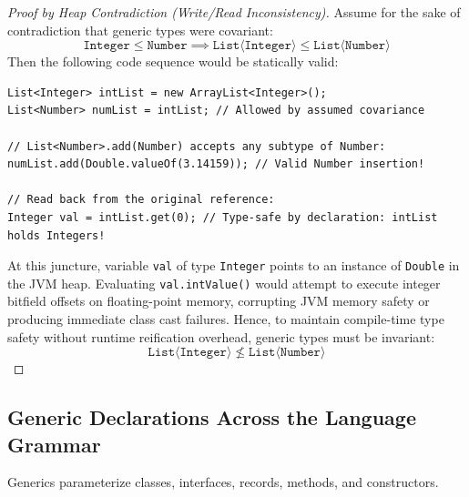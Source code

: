 \documentclass[10pt,journal,compsoc,onecolumn]{IEEEtran}
\begin{document}
\begin{proof}[Proof by Heap Contradiction (Write/Read Inconsistency)]
Assume for the sake of contradiction that generic types were covariant:
\begin{equation}
\texttt{Integer} \le \texttt{Number} \implies \texttt{List}\langle\texttt{Integer}\rangle \le \texttt{List}\langle\texttt{Number}\rangle
\end{equation}
Then the following code sequence would be statically valid:
\begin{lstlisting}
List<Integer> intList = new ArrayList<Integer>();
List<Number> numList = intList; // Allowed by assumed covariance

// List<Number>.add(Number) accepts any subtype of Number:
numList.add(Double.valueOf(3.14159)); // Valid Number insertion!

// Read back from the original reference:
Integer val = intList.get(0); // Type-safe by declaration: intList holds Integers!
\end{lstlisting}
At this juncture, variable \texttt{val} of type \texttt{Integer} points to an instance of \texttt{Double} in the JVM heap. Evaluating \texttt{val.intValue()} would attempt to execute integer bitfield offsets on floating-point memory, corrupting JVM memory safety or producing immediate class cast failures.
Hence, to maintain compile-time type safety without runtime reification overhead, generic types must be invariant:
\begin{equation}
\texttt{List}\langle\texttt{Integer}\rangle \not\le \texttt{List}\langle\texttt{Number}\rangle
\end{equation}
\end{proof}

\subsection{Generic Declarations Across the Language Grammar}
Generics parameterize classes, interfaces, records, methods, and constructors.
\end{document}

